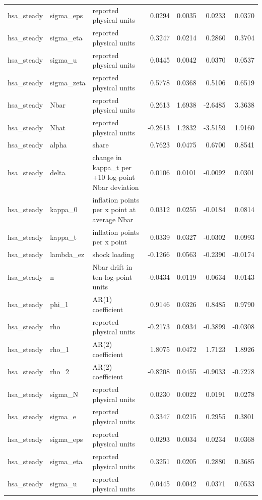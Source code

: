 \begin{tabular}{lllrrrr}
hsa\_steady & sigma\_eps & reported physical units & 0.0294 & 0.0035 & 0.0233 & 0.0370 \\
hsa\_steady & sigma\_eta & reported physical units & 0.3247 & 0.0214 & 0.2860 & 0.3704 \\
hsa\_steady & sigma\_u & reported physical units & 0.0445 & 0.0042 & 0.0370 & 0.0537 \\
hsa\_steady & sigma\_zeta & reported physical units & 0.5778 & 0.0368 & 0.5106 & 0.6519 \\
hsa\_steady & Nbar & reported physical units & 0.2613 & 1.6938 & -2.6485 & 3.3638 \\
hsa\_steady & Nhat & reported physical units & -0.2613 & 1.2832 & -3.5159 & 1.9160 \\
hsa\_steady & alpha & share & 0.7623 & 0.0475 & 0.6700 & 0.8541 \\
hsa\_steady & delta & change in kappa\_t per +10 log-point Nbar deviation & 0.0106 & 0.0101 & -0.0092 & 0.0301 \\
hsa\_steady & kappa\_0 & inflation points per x point at average Nbar & 0.0312 & 0.0255 & -0.0184 & 0.0814 \\
hsa\_steady & kappa\_t & inflation points per x point & 0.0339 & 0.0327 & -0.0302 & 0.0993 \\
hsa\_steady & lambda\_ez & shock loading & -0.1266 & 0.0563 & -0.2390 & -0.0174 \\
hsa\_steady & n & Nbar drift in ten-log-point units & -0.0434 & 0.0119 & -0.0634 & -0.0143 \\
hsa\_steady & phi\_1 & AR(1) coefficient & 0.9146 & 0.0326 & 0.8485 & 0.9790 \\
hsa\_steady & rho & reported physical units & -0.2173 & 0.0934 & -0.3899 & -0.0308 \\
hsa\_steady & rho\_1 & AR(2) coefficient & 1.8075 & 0.0472 & 1.7123 & 1.8926 \\
hsa\_steady & rho\_2 & AR(2) coefficient & -0.8208 & 0.0455 & -0.9033 & -0.7278 \\
hsa\_steady & sigma\_N & reported physical units & 0.0230 & 0.0022 & 0.0191 & 0.0278 \\
hsa\_steady & sigma\_e & reported physical units & 0.3347 & 0.0215 & 0.2955 & 0.3801 \\
hsa\_steady & sigma\_eps & reported physical units & 0.0293 & 0.0034 & 0.0234 & 0.0368 \\
hsa\_steady & sigma\_eta & reported physical units & 0.3251 & 0.0205 & 0.2880 & 0.3685 \\
hsa\_steady & sigma\_u & reported physical units & 0.0445 & 0.0042 & 0.0371 & 0.0533 \\

\end{tabular}
